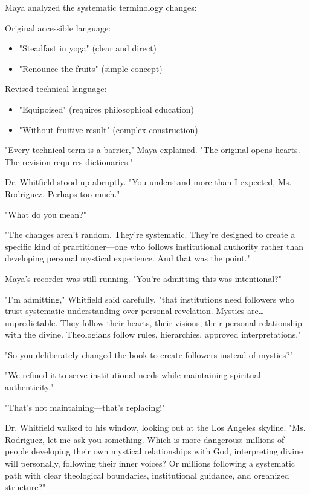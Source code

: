 \documentclass[12pt,twoside]{book}
\begin{document}
Maya analyzed the systematic terminology changes:

Original accessible language:
\begin{itemize}
\item "Steadfast in yoga" (clear and direct)
\item "Renounce the fruits" (simple concept)
\end{itemize}

Revised technical language:
\begin{itemize}
\item "Equipoised" (requires philosophical education)
\item "Without fruitive result" (complex construction)
\end{itemize}

"Every technical term is a barrier," Maya explained. "The original opens hearts. The revision requires dictionaries."

Dr. Whitfield stood up abruptly. "You understand more than I expected, Ms. Rodriguez. Perhaps too much."

"What do you mean?"

"The changes aren't random. They're systematic. They're designed to create a specific kind of practitioner—one who follows institutional authority rather than developing personal mystical experience. And that was the point."

Maya's recorder was still running. "You're admitting this was intentional?"

"I'm admitting," Whitfield said carefully, "that institutions need followers who trust systematic understanding over personal revelation. Mystics are\ldots{} unpredictable. They follow their hearts, their visions, their personal relationship with the divine. Theologians follow rules, hierarchies, approved interpretations."

"So you deliberately changed the book to create followers instead of mystics?"

"We refined it to serve institutional needs while maintaining spiritual authenticity."

"That's not maintaining—that's replacing!"

Dr. Whitfield walked to his window, looking out at the Los Angeles skyline. "Ms. Rodriguez, let me ask you something. Which is more dangerous: millions of people developing their own mystical relationships with God, interpreting divine will personally, following their inner voices? Or millions following a systematic path with clear theological boundaries, institutional guidance, and organized structure?"
\end{document}
